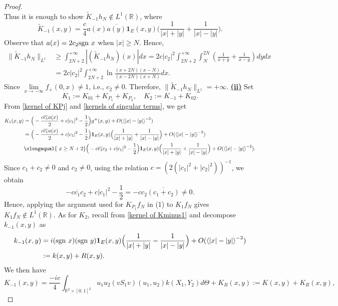 \documentclass[reqno]{amsart}
\newcommand\R{\mathbb{R}}
\numberwithin{equation}{section}
\begin{document}
\begin{proof}
\begin{equation*}
\end{equation*}
Thus it is enough to show $\widetilde{K}_{-1}h_N\not\in L^1(\R)$, where 
\begin{equation*}
    \widetilde{K}_{-1}(x,y)=\frac{c}{4}{a(x)}\overline{a(y)}\mathbf1_E(x,y)\Big(\frac{1}{|x|+|y|}+\frac{1}{|x|-|y|}\Big).
\end{equation*}
 Observe that $a(x)=2c_2{\rm sgn}\ x$ when $|x|\geq N$. Hence,
\begin{align*}
\|\widetilde{K}_{-1}h_N\|_{L^1}&\geq\int_{2N+2}^{+\infty}|(\widetilde{K}_{-1}h_N)(x)|dx=2c|c_2|^2\int_{2N+2}^{+\infty}\int_{N}^{2N}\left(\frac{1}{x+y}+\frac{1}{x-y}\right)dydx\\
&=2c|c_2|^2\int_{2N+2}^{+\infty}\ln \frac{(x+2N)(x-N)}{(x-2N)(x+N)}dx.
\end{align*}
Since $\lim\limits_{x\rightarrow-\infty}f_{+}(0,x)\neq1$, i.e., $c_2\neq0$. Therefore, $\|\widetilde{K}_{-1}h_N\|_{L^1}=+\infty$.
\vskip0.3cm
\underline{\bf(ii)} Set 
$$K_1:=K_{01}+K_{P_1}+K_{P_2},\quad K_2:=K_{-1}+K_{02}.$$
From \eqref{kernel of KPj} and \eqref{kernels of singular terms}, we get 
\begin{align*}
K_1(x,y)&=\Big(-\frac{c\overline{c_1}a(x)}{2}+c|c_1|^2-\frac{1}{2}\Big)g^{+}(x,y)+O(\left<|x|-|y|\right>^{-2})\\
&=\Big(-\frac{c\overline{c_1}a(x)}{2}+c|c_1|^2-\frac{1}{2}\Big)\mathbf1_E(x,y)\Big(\frac{1}{|x|+|y|}+\frac{1}{|x|-|y|}\Big)+O(\left<|x|-|y|\right>^{-2})\\
&\xlongequal{\ x\geq N+2}\Big(-c\overline{c_1}c_2+c|c_1|^2-\frac{1}{2}\Big)\mathbf1_E(x,y)\Big(\frac{1}{|x|+|y|}+\frac{1}{|x|-|y|}\Big)+O(\left<|x|-|y|\right>^{-2}).
\end{align*}
Since $c_1+c_2\neq0$ and $c_2\neq0$, using the relation $c=(2(|c_1|^2+|c_2|^2))^{-1}$,  we obtain $$-c\overline{c_1}c_2+c|c_1|^2-\frac{1}{2}=-cc_2\overline{(c_1+c_2)}\neq0.$$ Hence, applying the argument used for $K_{P_1}f_N$ in (1) to $K_1f_N$ gives $K_1f_N\not\in L^1(\R)$.
As for $K_2$, recall from \eqref{kernel of Kminus1} and decompose $k_{-1}(x,y)$ as 
\begin{align*}
k_{-1}(x,y)
&=i({\rm sgn}\ x)({\rm sgn}\ y)\mathbf1_E(x,y)\Big(\frac{1}{|x|+|y|}-\frac{1}{|x|-|y|}\Big)+O(\left<|x|-|y|\right>^{-2})\\
&:=k(x,y)+R(x,y).
\end{align*}
We then have
\begin{equation}\label{kernel of K-1}
K_{-1}(x,y)=\frac{-ic}{4}\int_{\R^2\times[0,1]^2}^{}u_1u_2(vS_1v)(u_1,u_2)k(X_1,Y_2)d\Theta+K_R(x,y):=K(x,y)+K_R(x,y),

\end{equation}
\end{proof}
\end{document}
